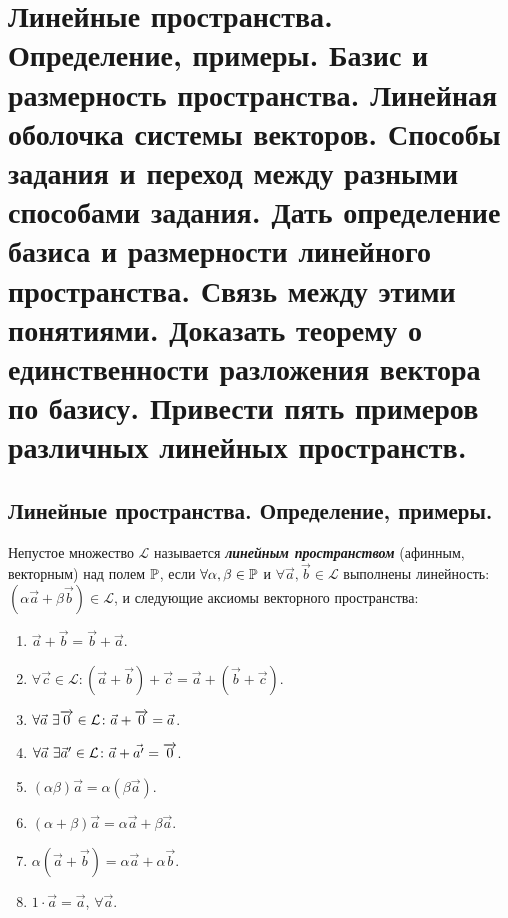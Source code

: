 \section{
    Линейные пространства. Определение, примеры. Базис и размерность пространства. Линейная оболочка системы векторов. Способы задания и переход между разными способами задания. Дать определение базиса и размерности линейного пространства. Связь между этими понятиями. Доказать теорему о единственности разложения вектора по базису. Привести пять примеров различных линейных пространств.
}

\subsection{
    Линейные пространства. Определение, примеры.
}

\begin{definition}
    Непустое множество $\mathcal{L}$ называется \textbf{\textit{линейным пространством}} (афинным, векторным) над полем $\mathbb{P}$, если $\forall \alpha, \beta \in \mathbb{P}$ и $\forall \vec{a}, \vec{b} \in \mathcal{L}$ выполнены  линейность:  $(\alpha \vec{a} + \beta \vec{b}) \in \mathcal{L}$, и следующие аксиомы векторного пространства:

    \begin{enumerate}[nosep]
        \item $\vec{a} + \vec{b} = \vec{b} + \vec{a}$.
        \item $\forall \vec{c} \in \mathcal{L} \colon (\vec{a} + \vec{b}) + \vec{c} = \vec{a} + (\vec{b} + \vec{c})$.
        \item $\forall \vec{a} \thinspace \thinspace \exists \overrightarrow{0} \in \mathcal{L} \colon \vec{a} + \overrightarrow{0} = \vec{a}$.
        \item $\forall \vec{a} \thinspace \thinspace \exists \vec{a}' \in \mathcal{L} \colon \vec{a} + \vec{a'} = \overrightarrow{0}$.
        \item $(\alpha \beta) \vec{a} = \alpha(\beta \vec{a})$.
        \item $(\alpha + \beta)\vec{a} = \alpha \vec{a} + \beta \vec{a}$.
        \item $\alpha(\vec{a} + \vec{b}) = \alpha \vec{a} + \alpha \vec{b}$.
        \item $1 \cdot \vec{a} = \vec{a}$, $\forall \vec{a}$.
    \end{enumerate}
\end{definition}

